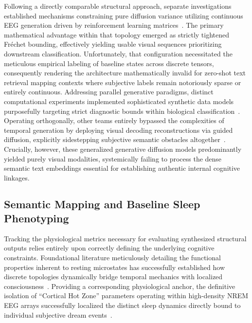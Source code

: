 \documentclass[journal]{IEEEtran}
\begin{document}
Following a directly comparable structural approach, separate investigations established mechanisms constraining pure diffusion variance utilizing continuous EEG generation driven by reinforcement learning matrices~\cite{an2024enhancingeegsignalgeneration}. The primary mathematical advantage within that topology emerged as strictly tightened Fréchet bounding, effectively yielding usable visual sequences prioritizing downstream classification. Unfortunately, that configuration necessitated the meticulous empirical labeling of baseline states across discrete tensors, consequently rendering the architecture mathematically invalid for zero-shot text retrieval mapping contexts where subjective labels remain notoriously sparse or entirely continuous. Addressing parallel generative paradigms, distinct computational experiments implemented sophisticated synthetic data models purposefully targeting strict diagnostic bounds within biological classification~\cite{10.3389/fnins.2023.1219133}. Operating orthogonally, other teams entirely bypassed the complexities of temporal generation by deploying visual decoding reconstructions via guided diffusion, explicitly sidestepping subjective semantic obstacles altogether~\cite{li2024visualdecodingreconstructioneeg, 11154007}. Crucially, however, these generalized generative diffusion models predominantly yielded purely visual modalities, systemically failing to process the dense semantic text embeddings essential for establishing authentic internal cognitive linkages.

\subsection{Semantic Mapping and Baseline Sleep Phenotyping}
Tracking the physiological metrics necessary for evaluating synthesized structural outputs relies entirely upon correctly defining the underlying cognitive constraints. Foundational literature meticulously detailing the functional properties inherent to resting microstates has successfully established how discrete topologies dynamically bridge temporal mechanics with localized consciousness~\cite{tarailis2024functional}. Providing a corresponding physiological anchor, the definitive isolation of ``Cortical Hot Zone'' parameters operating within high-density NREM EEG arrays successfully localized the distinct sleep dynamics directly bound to individual subjective dream events~\cite{siclari2018dreaming}. 
\end{document}
